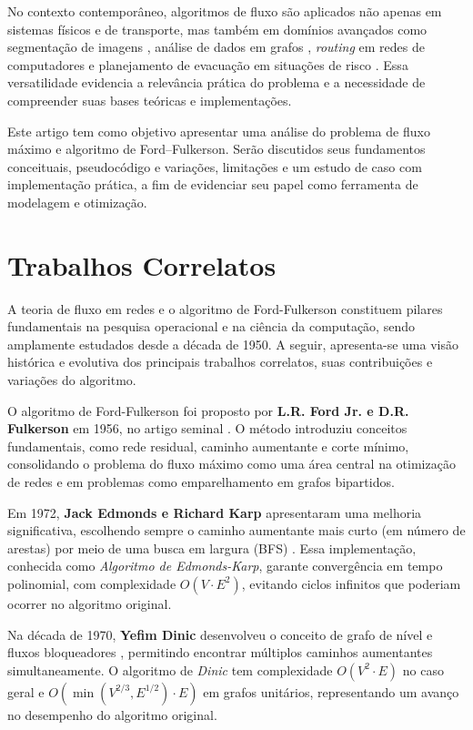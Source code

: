 \documentclass[12pt]{article}
\begin{document}
\noindent No contexto contemporâneo, algoritmos de fluxo são aplicados não apenas em sistemas físicos e de transporte, mas também em domínios avançados como segmentação de imagens \cite{boykov2001}, análise de dados em grafos \cite{ahuja1993}, \emph{routing} em redes de computadores \cite{kleinberg2006} e planejamento de evacuação em situações de risco \cite{chen2010}. Essa versatilidade evidencia a relevância prática do problema e a necessidade de compreender suas bases teóricas e implementações.

\noindent Este artigo tem como objetivo apresentar uma análise do problema de fluxo máximo e algoritmo de Ford–Fulkerson. Serão discutidos seus fundamentos conceituais, pseudocódigo e variações, limitações e um estudo de caso com implementação prática, a fim de evidenciar seu papel como ferramenta de modelagem e otimização.


\section{Trabalhos Correlatos} \label{sec:firstpage}

A teoria de fluxo em redes e o algoritmo de Ford-Fulkerson constituem pilares fundamentais na pesquisa operacional e na ciência da computação, sendo amplamente estudados desde a década de 1950. A seguir, apresenta-se uma visão histórica e evolutiva dos principais trabalhos correlatos, suas contribuições e variações do algoritmo.

\noindent O algoritmo de Ford-Fulkerson foi proposto por \textbf{L.R. Ford Jr. e D.R. Fulkerson} em 1956, no artigo seminal \cite{ford1956}. O método introduziu conceitos fundamentais, como rede residual, caminho aumentante e corte mínimo, consolidando o problema do fluxo máximo como uma área central na otimização de redes e em problemas como emparelhamento em grafos bipartidos.

Em 1972, \textbf{Jack Edmonds e Richard Karp} apresentaram uma melhoria significativa, escolhendo sempre o caminho aumentante mais curto (em número de arestas) por meio de uma busca em largura (BFS) \cite{edmonds1972}. Essa implementação, conhecida como \textit{Algoritmo de Edmonds-Karp}, garante convergência em tempo polinomial, com complexidade $O(V \cdot E^2)$, evitando ciclos infinitos que poderiam ocorrer no algoritmo original.

Na década de 1970, \textbf{Yefim Dinic} desenvolveu o conceito de grafo de nível e fluxos bloqueadores \cite{dinic1970}, permitindo encontrar múltiplos caminhos aumentantes simultaneamente. O algoritmo de \textit{Dinic} tem complexidade $O(V^2 \cdot E)$ no caso geral e $O(\min(V^{2/3}, E^{1/2}) \cdot E)$ em grafos unitários, representando um avanço no desempenho do algoritmo original.
\end{document}
